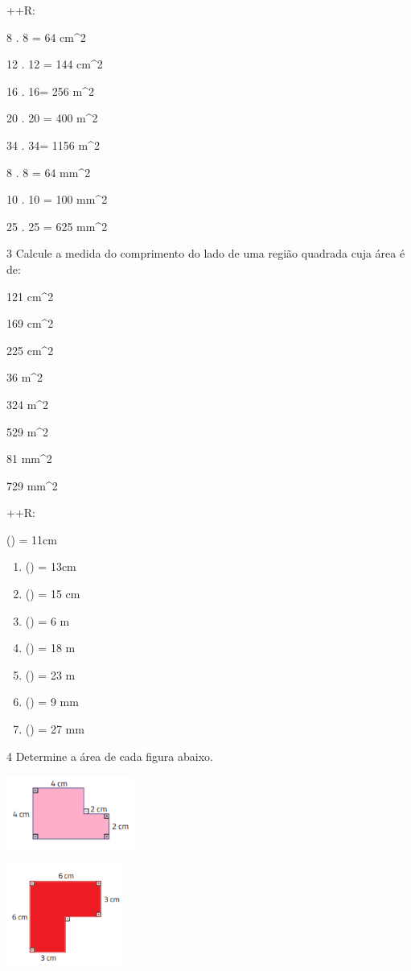 {++R:
\item 8 . 8 = 64 cm^2
\item 12 . 12 = 144 cm^2
\item16 . 16= 256 m^2
\item20 . 20 = 400 m^2
\item34 . 34= 1156 m^2
\item 8 . 8 = 64 mm^2
\item 10 . 10 = 100 mm^2
\item 25 . 25 = 625 mm^2

\num{3} Calcule a medida do comprimento do lado de uma região quadrada cuja
área é de:
\item 121 cm^2
\item 169 cm^2
\item 225 cm^2
\item 36 m^2
\item 324 m^2
\item 529 m^2
\item 81 mm^2
\item 729 mm^2

++R:
\item () = 11cm

\begin{enumerate}
\def\labelenumi{\alph{enumi})}
\setcounter{enumi}{1}
\item
  () = 13cm
\item
  () = 15 cm
\item
  () = 6 m
\item
  () = 18 m
\item
  () = 23 m
\item
  () = 9 mm
\item
  () = 27 mm
\end{enumerate}

\num{4} Determine a área de cada figura abaixo.
\item
\includegraphics[width=1.65in,height=0.96458in]{./imgSAEB_8_MAT/media/image43.png}
\item
\includegraphics[width=1.50833in,height=1.28681in]{./imgSAEB_8_MAT/media/image44.png}

}
